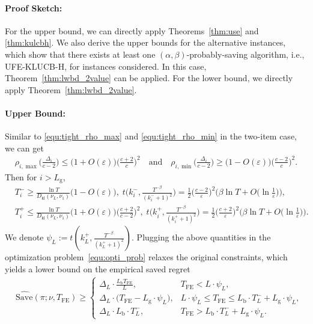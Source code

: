 \documentclass[twoside,11pt]{article}
\newcommand{\kl}{D_{\mathrm{kl}}}
\newcommand{\rmb}{\mathrm{b}}
\newcommand{\rmg}{\mathrm{g}}
\newcommand{\Tfe}{T_{\mathrm{FE}}}
\newcommand{\Saved}{\mathrm{Save}}
\newcommand{\ouralg}{\textsc{UFE-KLUCB-H}}
\begin{document}
\paragraph{Proof Sketch:} 
For the upper bound, we can directly apply Theorems~\ref{thm:use} and \ref{thm:kulcbh}.
We also derive the upper bounds for the alternative instances, which show that there exists at least one $(\alpha,\beta)$-probably-saving algorithm, i.e., \ouralg{}, for instances considered. In this case, Theorem~\ref{thm:lwbd_2value} can be applied.
For the lower bound, we directly apply Theorem~\ref{thm:lwbd_2value}. %

\paragraph{Upper Bound:}
Similar to \eqref{equ:tight_rho_max} and \eqref{equ:tight_rho_min} in the two-item case,  we can get
\begin{align}\label{equ:tight_rho_two_value}
     \rho_{i,\max}\Big(\frac{\Delta_i}{c-2}\Big)\leq \big(1+O(\varepsilon) \big)\Big(\frac{c+2}{c}\Big)^2
        \quad\mbox{and}\quad
     \rho_{i,\min}\Big(\frac{\Delta_i}{c-2}\Big)\geq \big(1-O(\varepsilon) \big)\Big(\frac{c-2}{c}\Big)^2.
\end{align}
Then for $i>L_{\rmg}$,
\begin{align}
    &
    T_i^- \geq \frac{\ln T}{\kl(\nu_L,\nu_1) }\big(1-O(\varepsilon) \big)
    ,\;
    t\Big(k_i^-,\frac{T^{-\beta}}{(k_i^-+1)^2}\Big)
        = 
        \frac{1}{2}\Big(\frac{c-2}{\varepsilon}\Big)^2\Big(\beta\ln T + O\Big(\ln\frac{1}{\varepsilon}\Big)\Big)
    ,
    \\
    &
    T_i^+ \leq \frac{\ln T}{\kl(\nu_L,\nu_1) }\big(1+O(\varepsilon) \big)\Big(\frac{c+2}{c-2}\Big)^2
    ,\;
     t\Big(k_i^+,\frac{T^{-\beta}}{(k_i^++1)^2}\Big)   
        =
        \frac{1}{2}\Big(\frac{c+2}{\varepsilon}\Big)^2\Big(\beta\ln T + O\Big(\ln\frac{1}{\varepsilon}\Big)\Big).
\end{align}
We denote $\psi_L:=t(k_L^+,\frac{T^{-\beta}}{(k_L^++1)^2})$.
Plugging the above quantities in the optimization problem~\eqref{equ:opti_prob} relaxes the original constraints, which yields a lower bound on the empirical saved regret
\begin{align}
    &\widehat{\Saved}(\pi;\nu,\Tfe)
    \geq
    \begin{cases}
        \Delta_L\cdot \frac{L_{\rmb} \Tfe}{L}, &\Tfe< L \cdot \psi_L , 
        \\
        \Delta_L\cdot \Big(\Tfe -L_{\rmg}\cdot \psi_L\Big)  ,&
             L\cdot  \psi_L 
            \leq
            \Tfe
            \leq
            L_{\rmb}\cdot T_L^- + L_{\rmg}\cdot \psi_L ,
        \\
        \Delta_L\cdot L_{\rmb}\cdot T_L^-, & \Tfe>L_{\rmb}\cdot T_L^- + L_{\rmg}\cdot\psi_L .
    \end{cases}
\end{align}
\end{document}
